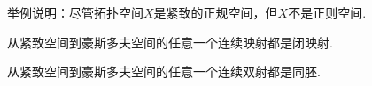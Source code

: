 \begin{example}
举例说明：尽管拓扑空间\(X\)是紧致的正规空间，但\(X\)不是正则空间.
\end{example}

\begin{theorem}
从紧致空间到豪斯多夫空间的任意一个连续映射都是闭映射.
\end{theorem}

\begin{corollary}
从紧致空间到豪斯多夫空间的任意一个连续双射都是同胚.
\end{corollary}
